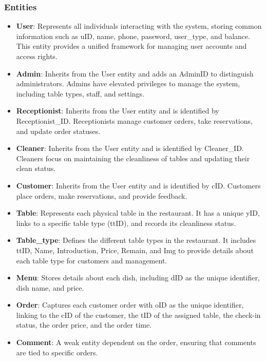 \documentclass[12pt]{article}
\begin{document}
\subsubsection{Entities}
\begin{itemize}
    \item \textbf{User}: Represents all individuals interacting with the system, storing common information such as uID, name, phone, password, user\_type, and balance. This entity provides a unified framework for managing user accounts and access rights.
    \item \textbf{Admin}: Inherits from the User entity and adds an AdminID to distinguish administrators. Admins have elevated privileges to manage the system, including table types, staff, and settings.
    \item \textbf{Receptionist}: Inherits from the User entity and is identified by Receptionist\_ID. Receptionists manage customer orders, take reservations, and update order statuses.
    \item \textbf{Cleaner}: Inherits from the User entity and is identified by Cleaner\_ID. Cleaners focus on maintaining the cleanliness of tables and updating their clean status.
    \item \textbf{Customer}: Inherits from the User entity and is identified by cID. Customers place orders, make reservations, and provide feedback.
    \item \textbf{Table}: Represents each physical table in the restaurant. It has a unique yID, links to a specific table type (ttID), and records its cleanliness status.
    \item \textbf{Table\_type}: Defines the different table types in the restaurant. It includes ttID, Name, Introduction, Price, Remain, and Img to provide details about each table type for customers and management.
    \item \textbf{Menu}: Stores details about each dish, including dID as the unique identifier, dish name, and price.
    \item \textbf{Order}: Captures each customer order with oID as the unique identifier, linking to the cID of the customer, the tID of the assigned table, the check-in status, the order price, and the order time.
    \item \textbf{Comment}: A weak entity dependent on the order, ensuring that comments are tied to specific orders.
\end{itemize}
\end{document}

